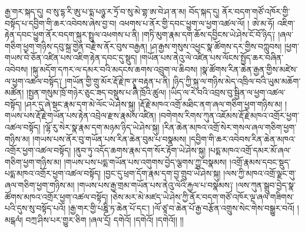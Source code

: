རྒྱ་གར་སྐད་དུ། བ་སུ་དྷ་རི་ཨུ་པ་དྨ་པཉྩ་ར་ཏྲོ་བ་སུ་མེ་གྷ་ཨ་བེ་ཤ་ན་མ། བོད་སྐད་དུ། ནོར་བདག་གཙོ་འཁོར་གྱི་བསྟོད་པ་དབྱིག་གི་ཆར་འབེབས་ཞེས་བྱ་བ། འཕགས་པ་ནོར་གྱི་དབང་ཕྱུག་ལ་ཕྱག་འཚལ་ལོ། ། ཨེ་མ་ཧོ། འཇིག་རྟེན་དབང་ཕྱུག་ནོར་བདག་སྐུར་སྤྲུལ་འཕགས་པ་ནི། །གཏི་མུག་རྣམ་དག་ཆོས་དབྱིངས་ཡེ་ཤེས་ངོ་བོ་ཉིད༑ །ཞལ་གཅིག་ཕྱག་གཉིས་དབུ་སྐྲ་གྱེན་བརྫེས་ནོར་བུས་བརྒྱན། །ཤ་རྒྱས་གསུས་འཕྱང་སྣ་ཚོགས་དར་གྱིས་བཀླུབས། །ཕྱག་གཡས་བེ་ཅོན་འཛིན་པས་འཇིག་རྟེན་དབང་དུ་སྡུད། །གཡོན་པས་ནེའུ་ལེ་འཛིན་པས་ལོངས་སྤྱོད་ཆར་བཞིན་འབེབས། །སྐུ་མདོག་དཀར་ལ་དམར་བའི་མདངས་ཆགས་འབྲུག་ལ་ཆིབས། །སྣ་ཚོགས་རིན་ཆེན་རྒྱན་གྱིས་མཛེས་ལ་ཕྱག་འཚལ་བསྟོད༑ །གཡོན་གྱི་གྲུ་མོར་རྡོ་རྗེ་ཁ་ཊྭཱ་བརྟན་པ་ནི། །ཉིད་ཀྱི་སྐུ་ལ་གཉིས་མེད་འཁྲིལ་བའི་ཡུམ་མཆོག་མཚོན། །སྤྱན་གསུམ་ཁྲོ་གཉེར་ཅུང་ཟད་བསྡུས་པ་ཞི་ཁྲོའི་ཚུལ། །ཡིད་ལ་རེ་བའི་འབྲས་བུ་སྦྱིན་ལ་ཕྱག་འཚལ་བསྟོད། །ཤར་དུ་ཞེ་སྡང་རྣམ་དག་མེ་ལོང་ཡེ་ཤེས་སྐུ། །རྡོ་རྗེ་མཁའ་འགྲོ་མཐིང་ནག་ཞལ་གཅིག་ཕྱག་གཉིས་མ། །གཡས་པས་རྡོ་རྗེ་གཡོན་པས་རྟེན་འབྲེལ་རྫས་རྣམས་འཛིན། །བགེགས་རིགས་ཀུན་འཇོམས་རྡོ་རྗེ་མཁའ་འགྲོར་ཕྱག་འཚལ་བསྟོད། །ལྷོ་རུ་སེར་སྣ་རྣམ་དག་མཉམ་ཉིད་ཡེ་ཤེས་སྐུ། །རིན་ཆེན་མཁའ་འགྲོ་སེར་གསལ་ཞལ་གཅིག་ཕྱག་གཉིས་མ། །གཡས་པས་ནོར་བུ་གཡོན་པས་རིན་ཆེན་བུམ་པ་བསྣམས། །དབྱིག་གི་ཆར་འབེབས་རིན་ཆེན་མཁའ་འགྲོར་ཕྱག་འཚལ་བསྟོད། །ནུབ་ཏུ་འདོད་ཆགས་རྣམ་དག་སོར་རྟོག་ཡེ་ཤེས་སྐུ། །པདྨ་མཁའ་འགྲོ་དམར་མོ་ཞལ་གཅིག་ཕྱག་གཉིས་མ། །གཡས་པས་པདྨ་གཡོན་པས་འགུགས་བྱེད་ལྕགས་ཀྱུ་བསྣམས། །འགྲོ་རྣམས་དབང་སྡུད་པདྨ་མཁའ་འགྲོར་ཕྱག་འཚལ་བསྟོད། །བྱང་དུ་ཕྲག་དོག་རྣམ་དག་བྱ་གྲུབ་ཡེ་ཤེས་སྐུ། །ལས་ཀྱི་མཁའ་འགྲོ་ལྗང་གུ་ཞལ་གཅིག་ཕྱག་གཉིས་མ། །གཡས་པས་རྒྱ་གྲམ་གཡོན་པས་ནེའུ་ལེའི་རྐྱལ་པ་བསྣམས༑ །ལས་ཀུན་སྒྲུབ་བྱེད་སྣ་ཚོགས་མཁའ་འགྲོར་ཕྱག་འཚལ་བསྟོད། །ཅེས་མར་མེ་མཛད་ཡེ་ཤེས་ཀྱི་ནོར་བདག་གཙོ་འཁོར་ལྔ་ཞལ་གཟིགས་པའི་དུས་སུ་བསྟོད་པའོ། །རྒྱ་གར་གྱི་པཎྜི་ཏ་ཆེན་པོ་དང་། །ལོ་ཙཱ་བ་ཆེན་པོ་རྒྱ་བརྩོན་འགྲུས་སེང་གེས་བསྒྱུར་བའོ། །མངྒལཾ། བཀྲ་ཤིས་པར་གྱུར་ཅིག །ཞལ་དྲོ། དགེའོ། །དགེའོ། །དགེའོ།། །།
